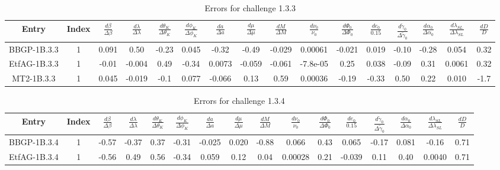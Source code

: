 \documentclass[prd,aps,amsfonts,amsmath, nofootinbib]{revtex4}
\begin{document}
\begin{table}
\caption{\label{EMRI_err} Errors for challenge 1.3.3}
\begin{ruledtabular}
\begin{tabular}{|c|c|c|c|c|c|c|c|c|c|c|c|c|c|c|c|}
Entry & Index & $\frac{d\beta}{\Delta\beta}$ & 
$\frac{d\lambda}{\Delta\lambda}$ &
 $\frac{d\theta_K}{\Delta\theta_K}$ & $\frac{d\phi_K}{\Delta\phi_K}$ 
 & $\frac{da}{\Delta a}$ & $\frac{d\mu}{\Delta\mu}$ & 
 $\frac{dM}{\Delta M}$ &  $\frac{d\nu_0}{\nu_0}$ & 
 $\frac{d\Phi_0}{\Delta\Phi_0}$ &  $\frac{de_0}{0.15}$ & 
 $\frac{d\tilde{\gamma}_0}{\Delta\tilde{\gamma}_0}$ &
 $\frac{d\alpha_0}{\Delta\alpha_0}$ & 
 $\frac{d\lambda_{SL}}{\Delta\lambda_{SL}}$ &
  $\frac{dD}{D}$ \\ 
\hline
BBGP-1B.3.3 & 1 &  0.091   &   0.50   &   -0.23   &   0.045   &   -0.32   &   -0.49   &   -0.029   &   0.00061   &   -0.021   &   0.019   &   -0.10   &   -0.28   &   0.054   &   0.32 \\
EtfAG-1B.3.3 & 1 &  -0.01   &   -0.004   &   0.49   &   -0.34   &   0.0073   &   -0.059   &   -0.061   &   -7.8e-05   &   0.25   &   0.038   &   -0.09   &   0.31   &   0.0061   &   0.32\\
MT2-1B.3.3 & 1 &  0.045   &   -0.019   &   -0.1   &   0.077   &   -0.066   &   0.13   &   0.59   &   0.00036   &   -0.19   &   -0.33   &   0.50   &   0.22   &   0.010   &   -1.7\\
\hline
\end{tabular}
\end{ruledtabular}
\end{table}


\begin{table}
\caption{\label{EMRI_err} Errors for challenge 1.3.4}
\begin{ruledtabular}
\begin{tabular}{|c|c|c|c|c|c|c|c|c|c|c|c|c|c|c|c|}
Entry & Index & $\frac{d\beta}{\Delta\beta}$ & 
$\frac{d\lambda}{\Delta\lambda}$ &
 $\frac{d\theta_K}{\Delta\theta_K}$ & $\frac{d\phi_K}{\Delta\phi_K}$ 
 & $\frac{da}{\Delta a}$ & $\frac{d\mu}{\Delta\mu}$ & 
 $\frac{dM}{\Delta M}$ &  $\frac{d\nu_0}{\nu_0}$ & 
 $\frac{d\Phi_0}{\Delta\Phi_0}$ &  $\frac{de_0}{0.15}$ & 
 $\frac{d\tilde{\gamma}_0}{\Delta\tilde{\gamma}_0}$ &
 $\frac{d\alpha_0}{\Delta\alpha_0}$ & 
 $\frac{d\lambda_{SL}}{\Delta\lambda_{SL}}$ &
  $\frac{dD}{D}$ \\ 
\hline
BBGP-1B.3.4 & 1 &  -0.57   &   -0.37   &   0.37   &   -0.31   &   -0.025   &   0.020   &   -0.88   &   0.066   &   0.43   &   0.065   &   -0.17   &   0.081   &   -0.16   &   0.71 \\
EtfAG-1B.3.4 & 1 & -0.56   &   0.49   &   0.56   &   -0.34   &   0.059   &   0.12   &   0.04   &   0.00028   &   0.21   &   -0.039   &   0.11   &   0.40   &   0.0040   &   0.71 \\
\hline
\end{tabular}
\end{ruledtabular}
\end{table}
\end{document}
